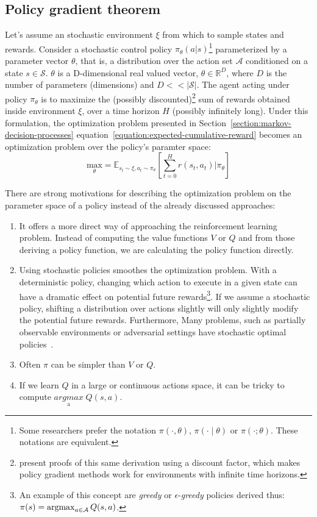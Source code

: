 \documentclass{../main.tex}{}
\begin{document}
\subsection{Policy gradient theorem}

Let's assume an stochastic environment $\xi$ from which to sample states and rewards. Consider a stochastic control policy  $\pi_{\theta}(a | s)$\footnote{Some researchers prefer the notation $\pi(\cdot, \theta)$, $\pi(\cdot \mid \theta)$ or $\pi(\cdot; \theta)$. These notations are equivalent.} parameterized by a parameter vector $\theta$, that is, a distribution over the action set $\mathcal{A}$ conditioned on a state $s \in \mathcal{S}$. $\theta$ is a D-dimensional real valued vector,  $\theta \in \mathbb{R}^{D}$, where $D$ is the number of parameters (dimensions) and $D << |\mathcal{S}|$. The agent acting under policy $\pi_{\theta}$ is to maximize the (possibly discounted)\footnote{\cite{Williams1992, Sutton1999} present proofs of this same derivation using a discount factor, which makes policy gradient methods work for environments with infinite time horizons.} sum of rewards obtained inside environment $\xi$, over a time horizon $H$ (possibly infinitely long). Under this formulation, the optimization problem presented in Section~\ref{section:markov-decision-processes} equation~\ref{equation:expected-cumulative-reward} becomes an optimization problem over the policy's paramter space:
\begin{equation}\label{equation:expected-reward-theta}
    \underset{\theta}{\text{max}} = \mathbb{E}_{s_{t} \sim \xi, a_t \sim \pi_{\theta}}[\sum^{H}_{t=0} r(s_t, a_t) | \pi_{\theta}]
\end{equation}

There are strong motivations for describing the optimization problem on the parameter space of a policy instead of the already discussed approaches:
\begin{enumerate}
\item It offers a more direct way of approaching the reinforcement learning problem. Instead of computing the value functions $V$ or $Q$ and from those deriving a policy function, we are calculating the policy function directly.
\item Using stochastic policies smoothes the optimization problem. With a deterministic policy, changing which action to execute in a given state can have a dramatic effect on potential future rewards\footnote{An example of this concept are \textit{greedy} or $\epsilon$-\textit{greedy} policies derived thus: $\pi(s) = \operatorname*{argmax}_{a \in \mathcal{A}} Q(s,a)$.}. If we assume a stochastic policy, shifting a distribution over actions slightly will only slightly modify the potential future rewards. Furthermore, Many problems, such as partially observable environments or adversarial settings have stochastic optimal policies~\citep{Degris2012, Lanctot2017}.
\item Often $\pi$ can be simpler than $V$ or $Q$.
\item If we learn $Q$ in a large or continuous actions space, it can be tricky to compute $\underset{\text{a}}{argmax}\; Q(s,a)$.
\end{enumerate}
 
\end{document}
